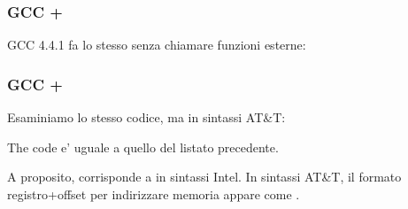 \subsubsection{GCC + \IntelSyntax}

GCC 4.4.1 fa lo stesso senza chiamare funzioni esterne:



\subsubsection{GCC + \ATTSyntax}

Esaminiamo lo stesso codice, ma in sintassi AT\&T:



\myindex{\ATTSyntax}
The code e' uguale a quello del listato precedente.

A proposito,  corrisponde a  in sintassi Intel.
In sintassi AT\&T, il formato registro+offset per indirizzare memoria appare come .

